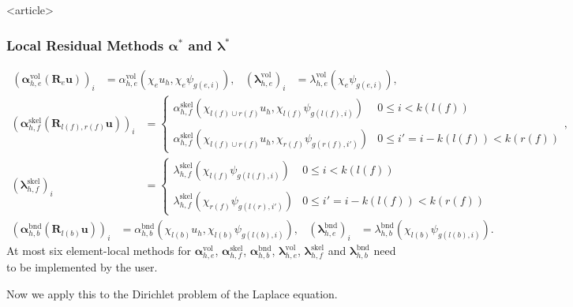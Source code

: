 \begin{frame}<article>
\frametitle<presentation>{Local Residual Methods $\bm{\alpha}^\ast$ and $\bm{\lambda}^\ast$}
{\small\begin{align*}
\left(\bm{\alpha}^\text{vol}_{h,e}(\mathbf{R}_e\mathbf{u})\right)_i &=
\alpha^\text{vol}_{h,e}(\chi_e u_h,\chi_e \psi_{g(e,i)}), &
\left(\bm{\lambda}^\text{vol}_{h,e}\right)_i &=
\lambda^\text{vol}_{h,e}(\chi_e \psi_{g(e,i)}),
\end{align*}}
{\small
\begin{align*}
\left(\bm{\alpha}^\text{skel}_{h,f}(\mathbf{R}_{l(f),r(f)}\mathbf{u})\right)_i &=
\left\{\begin{array}{ll}
\alpha^\text{skel}_{h,f}(\chi_{l(f)\cup r(f)} u_h,\chi_{l(f)}\psi_{g(l(f),i)}) & 0\leq i<k(l(f))\\
\mbox{}\\
\alpha^\text{skel}_{h,f}(\chi_{l(f)\cup r(f)} u_h,\chi_{r(f)}\psi_{g(r(f),i')}) & 0\leq i'=i-k(l(f))<k(r(f))
\end{array}\right., \\
\left(\bm{\lambda}^\text{skel}_{h,f}\right)_i &=
\left\{\begin{array}{ll}
\lambda^\text{skel}_{h,f}(\chi_{l(f)}\psi_{g(l(f),i)}) & 0\leq i<k(l(f))\\
\mbox{}\\
\lambda^\text{skel}_{h,f}(\chi_{r(f)}\psi_{g(l(r),i')}) & 0\leq i'=i-k(l(f))<k(r(f))
\end{array}\right.
\end{align*}}
{\small\begin{align*}
\left(\bm{\alpha}^\text{bnd}_{h,b}(\mathbf{R}_{l(b)}\mathbf{u})\right)_i &=
\alpha^\text{bnd}_{h,b}(\chi_{l(b)} u_h,\chi_{l(b)} \psi_{g(l(b),i)}), &
\left(\bm{\lambda}^\text{bnd}_{h,e}\right)_i &=
\lambda^\text{bnd}_{h,b}(\chi_{l(b)}\psi_{g(l(b),i)}).
\end{align*}}
At most six element-local methods for $\bm{\alpha}^\text{vol}_{h,e}$,
$\bm{\alpha}^\text{skel}_{h,f}$, $\bm{\alpha}^\text{bnd}_{h,b}$,
$\bm{\lambda}^\text{vol}_{h,e}$, $\bm{\lambda}^\text{skel}_{h,f}$ and
$\bm{\lambda}^\text{bnd}_{h,b}$ need to be implemented by the user.
\end{frame}

Now we apply this to the Dirichlet problem of the Laplace equation.

